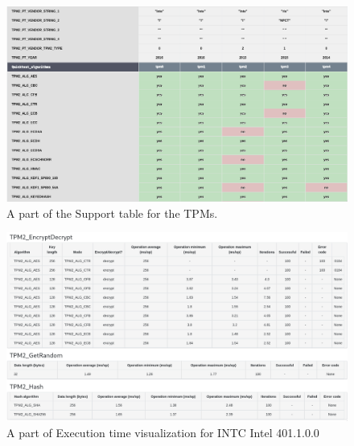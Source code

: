 \begin{landscape}
    \begin{figure}[!t]
        \includegraphics[width=\linewidth, height=\textwidth]{img/visualizations/tpm-support-data.png}
        \caption{A part of the Support table for the TPMs.}
    \end{figure}
\end{landscape}

\begin{landscape}
    \begin{figure}[!t]
        \includegraphics[width=\linewidth, height=\textwidth]{img/visualizations/tpm-execution-time.png}
        \caption{A part of Execution time visualization for INTC Intel 401.1.0.0}
    \end{figure}
\end{landscape}

